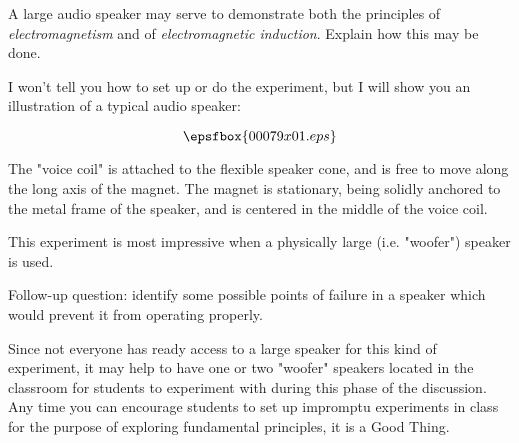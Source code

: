 

A large audio speaker may serve to demonstrate both the principles of {\it electromagnetism} and of {\it electromagnetic induction}.  Explain how this may be done.







I won't tell you how to set up or do the experiment, but I will show you an illustration of a typical audio speaker:

$$\epsfbox{00079x01.eps}$$

The "voice coil" is attached to the flexible speaker cone, and is free to move along the long axis of the magnet.  The magnet is stationary, being solidly anchored to the metal frame of the speaker, and is centered in the middle of the voice coil.

This experiment is most impressive when a physically large (i.e. "woofer") speaker is used.
 
\vskip 10pt

Follow-up question: identify some possible points of failure in a speaker which would prevent it from operating properly.







Since not everyone has ready access to a large speaker for this kind of experiment, it may help to have one or two "woofer" speakers located in the classroom for students to experiment with during this phase of the discussion.  Any time you can encourage students to set up impromptu experiments in class for the purpose of exploring fundamental principles, it is a Good Thing.




